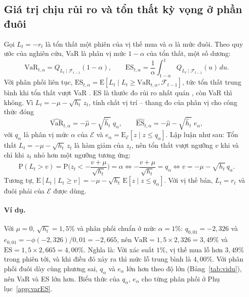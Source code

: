 \documentclass[12pt,a4paper]{article}
\theoremstyle{definition}
\theoremstyle{remark}
\newcommand{\E}{\mathrm{E}}
\newcommand{\Prob}{\mathrm{P}}
\newcommand{\VaR}{\mathrm{VaR}}
\newcommand{\ES}{\mathrm{ES}}
\newcommand{\Fcal}{\mathcal{F}}
\newcommand{\Ecal}{\mathcal{E}}
\begin{document}
\subsection{Giá trị chịu rủi ro và tổn thất kỳ vọng ở phần đuôi}

Gọi $L_t=-r_t$ là tổn thất một phiên của vị thế mua và $\alpha$ là mức đuôi. Theo quy ước của nghiên cứu, VaR là phân vị mức $1-\alpha$ của tổn thất, một số dương:
\begin{equation}
\VaR_{t,\alpha}=Q_{L_t\mid\Fcal_{t-1}}(1-\alpha),\qquad
\ES_{t,\alpha}=\frac1\alpha\int_{1-\alpha}^{1}Q_{L_t\mid\Fcal_{t-1}}(u)\,du .
\end{equation}
Với phân phối liên tục, $\ES_{t,\alpha}=\E[L_t\mid L_t\ge\VaR_{t,\alpha},\Fcal_{t-1}]$, tức tổn thất trung bình khi tổn thất vượt VaR \cite{rockafellar2000}. ES là thước đo rủi ro nhất quán \cite{artzner1999,acerbitasche2002}, còn VaR thì không. Vì $L_t=-\mu-\sqrt{h_t}\,z_t$, tính chất vị trí -- thang đo của phân vị cho công thức đóng
\begin{equation}\label{eq:var1}
\widehat{\VaR}_{t,\alpha}=-\hat\mu-\sqrt{\hat h_t}\;q_\alpha,\qquad
\widehat{\ES}_{t,\alpha}=-\hat\mu-\sqrt{\hat h_t}\;e_\alpha,
\end{equation}
với $q_\alpha$ là phân vị mức $\alpha$ của $\Ecal$ và $e_\alpha=\E_\Ecal[z\mid z\le q_\alpha]$. Lập luận như sau: Tổn thất $L_t=-\mu-\sqrt{h_t}\,z_t$ là hàm giảm của $z_t$, nên tổn thất vượt ngưỡng $v$ khi và chỉ khi $z_t$ nhỏ hơn một ngưỡng tương ứng:
\begin{equation*}
\Prob(L_t>v)=\Prob\Big(z_t<-\frac{v+\mu}{\sqrt{h_t}}\Big)=\alpha\iff -\frac{v+\mu}{\sqrt{h_t}}=q_\alpha\iff v=-\mu-\sqrt{h_t}\,q_\alpha .
\end{equation*}
Tương tự, $\E[L_t\mid L_t\ge v]=-\mu-\sqrt{h_t}\,\E[z\mid z\le q_\alpha]$. Với vị thế bán, $L_t=r_t$ và đuôi phải của $\Ecal$ được dùng.

\paragraph{Ví dụ.} Với $\mu=0$, $\sqrt{h_t}=1{,}5\%$ và phân phối chuẩn ở mức $\alpha=1\%$: $q_{0,01}=-2{,}326$ và $e_{0,01}=-\phi(-2{,}326)/0{,}01=-2{,}665$, nên $\VaR=1{,}5\times2{,}326=3{,}49\%$ và $\ES=1{,}5\times2{,}665=4{,}00\%$. Nghĩa là: Với xác suất $1\%$, vị thế mua lỗ hơn $3{,}49\%$ trong phiên tới, và khi điều đó xảy ra thì mức lỗ trung bình là $4{,}00\%$. Với phân phối đuôi dày cùng phương sai, $q_\alpha$ và $e_\alpha$ lớn hơn theo độ lớn (Bảng~\ref{tab:vidu}), nên VaR và ES lớn hơn. Biểu thức của $q_\alpha$, $e_\alpha$ cho từng phân phối ở Phụ lục~\ref{app:varES}.
\end{document}
